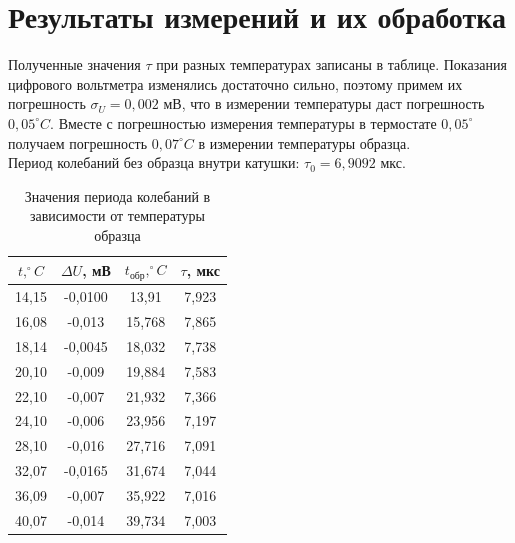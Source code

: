 \documentclass[a4paper, 12pt]{article}
\begin{document}
	
	\section* {Результаты измерений и их обработка}
	Полученные значения $\tau$ при разных температурах записаны в таблице. Показания цифрового вольтметра изменялись достаточно сильно, поэтому примем их погрешность $\sigma_U = 0,002$ мВ, что в измерении температуры даст погрешность $0,05^{\circ} C$. Вместе с погрешностью измерения температуры в термостате $0,05^{\circ}$ получаем погрешность $0,07^{\circ} C$ в измерении температуры образца.\\
	Период колебаний без образца внутри катушки: $\tau_0 = 6,9092$ мкс.
	\begin{table}[h!]
		\centering
		\begin{tabular}{|c|c|c|c|}
			\hline
			$t, ^{\circ}C$ & $\Delta U$, мВ & $t_{\text{обр}}, ^{\circ} C$ & $\tau$, мкс \\ \hline
			14,15 & -0,0100 & 13,91 & 7,923 \\ \hline
			16,08 & -0,013 & 15,768 & 7,865 \\ \hline
			18,14 & -0,0045 & 18,032 & 7,738 \\ \hline
			20,10 & -0,009 & 19,884 & 7,583 \\ \hline
			22,10 & -0,007 & 21,932 & 7,366 \\ \hline
			24,10 & -0,006 & 23,956 & 7,197 \\ \hline
			28,10 & -0,016 & 27,716 & 7,091 \\ \hline
			32,07 & -0,0165 & 31,674 & 7,044 \\ \hline
			36,09 & -0,007 & 35,922 & 7,016 \\ \hline
			40,07 & -0,014 & 39,734 & 7,003 \\ \hline
		\end{tabular}
		\caption{Значения периода колебаний в зависимости от температуры образца}
	\end{table}
	
\end{document}
